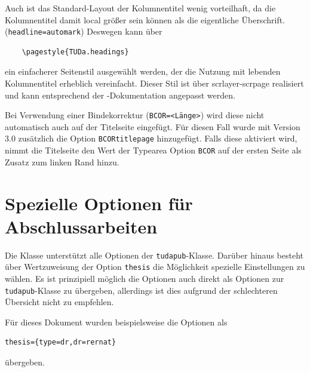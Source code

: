\documentclass[
	ngerman,
	ruledheaders=chapter,%
	class=book,%
	thesis={
		type=dr,
		dr=rernat
	},
	accentcolor=9c,%
	custommargins=true,%
	marginpar=false,%
	fontsize=11pt,%
]{tudapub}
\let\file\texttt
\let\code\texttt
\let\pck\textsf
\begin{document}
Auch ist das Standard-Layout der Kolumnentitel wenig vorteilhaft, da die Kolumnentitel damit local größer sein können als die eigentliche Überschrift. (\code{headline=automark})
Deswegen kann über
\begin{verbatim}
	\pagestyle{TUDa.headings}
\end{verbatim}
ein einfacherer Seitenstil ausgewählt werden, der die Nutzung mit lebenden Kolumnentitel erheblich vereinfacht. Dieser Stil ist über \pck{scrlayer-scrpage} realisiert und kann entsprechend der \KOMAScript{}-Dokumentation angepasst werden.

Bei Verwendung einer Bindekorrektur (\code{BCOR=<Länge>}) wird diese nicht automatisch auch auf der Titelseite eingefügt. Für diesen Fall wurde mit Version 3.0 zusätzlich die Option \code{BCORtitlepage} hinzugefügt. Falls diese aktiviert wird, nimmt die Titelseite den Wert der Typearea Option \code{BCOR} auf der ersten Seite als Zusatz zum linken Rand hinzu.

\section{Spezielle Optionen für Abschlussarbeiten}
Die Klasse unterstützt alle Optionen der \file{tudapub}-Klasse. Darüber hinaus besteht über Wertzuweisung der Option \code{thesis} die Möglichkeit spezielle Einstellungen zu wählen.
Es ist prinzipiell möglich die Optionen auch direkt als Optionen zur \file{tudapub}-Klasse zu übergeben, allerdings ist dies aufgrund der schlechteren Übersicht nicht zu empfehlen.

Für dieses Dokument wurden beispielsweise die Optionen als
\begin{verbatim}
thesis={type=dr,dr=rernat}
\end{verbatim}
übergeben.
\end{document}
